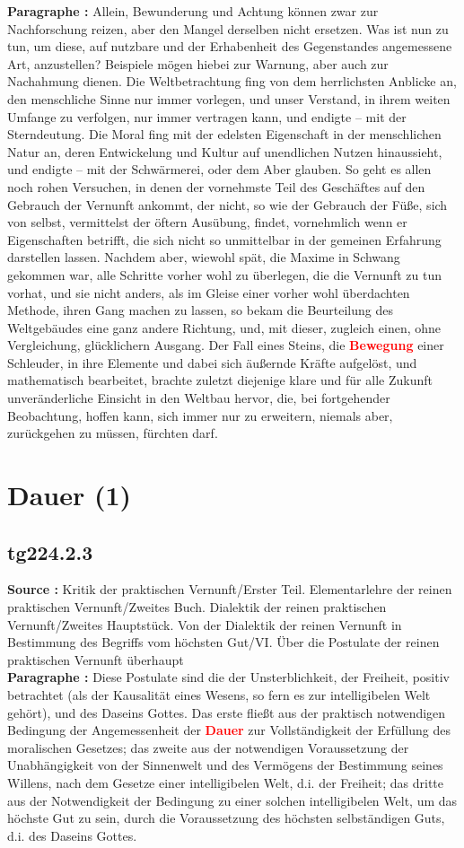 \documentclass[a4paper,12pt,twoside]{book}
\newcommand{\match}[1]{\textcolor{red}{\textbf{#1}}}
\newcommand{\unnumberedsection}[1]{
	\section*{#1}
	\addcontentsline{toc}{section}{#1}
	\markright{#1}
}
\begin{document}
	\textbf{Paragraphe : }Allein, Bewunderung und Achtung können zwar zur Nachforschung reizen, aber den Mangel derselben nicht ersetzen.  Was ist nun zu tun, um diese, auf nutzbare und der Erhabenheit des Gegenstandes angemessene Art, anzustellen? Beispiele mögen hiebei zur Warnung, aber auch zur Nachahmung dienen. Die Weltbetrachtung fing von dem herrlichsten Anblicke an, den menschliche Sinne nur immer vorlegen, und unser Verstand, in ihrem weiten Umfange zu verfolgen, nur immer vertragen kann, und endigte – mit der Sterndeutung. Die Moral fing mit der edelsten Eigenschaft in der menschlichen Natur an, deren Entwickelung und Kultur auf unendlichen Nutzen hinaussieht, und endigte – mit der Schwärmerei, oder dem Aber glauben. So geht es allen noch rohen Versuchen, in denen der vornehmste Teil des Geschäftes auf den Gebrauch der Vernunft ankommt, der nicht, so wie der Gebrauch der Füße, sich von selbst, vermittelst der öftern Ausübung, findet, vornehmlich wenn er Eigenschaften betrifft, die sich nicht so unmittelbar in der gemeinen Erfahrung darstellen lassen. Nachdem aber, wiewohl spät, die Maxime in Schwang gekommen war, alle Schritte vorher wohl zu überlegen, die die Vernunft zu tun vorhat, und sie nicht anders, als im Gleise einer vorher wohl überdachten Methode, ihren Gang machen zu lassen, so bekam die Beurteilung des Weltgebäudes eine ganz andere Richtung, und, mit dieser, zugleich einen, ohne Vergleichung, glücklichern Ausgang. Der Fall eines Steins, die \match{Bewegung} einer Schleuder, in ihre Elemente und dabei sich äußernde Kräfte aufgelöst, und mathematisch bearbeitet, brachte zuletzt diejenige klare und für alle Zukunft unveränderliche Einsicht in den Weltbau hervor, die, bei fortgehender Beobachtung, hoffen kann, sich immer nur zu erweitern, niemals aber, zurückgehen zu müssen, fürchten darf. 
	
	\unnumberedsection{Dauer (1)} 
	\subsection*{tg224.2.3} 
	\textbf{Source : }Kritik der praktischen Vernunft/Erster Teil. Elementarlehre der reinen praktischen Vernunft/Zweites Buch. Dialektik der reinen praktischen Vernunft/Zweites Hauptstück. Von der Dialektik der reinen Vernunft in Bestimmung des Begriffs vom höchsten Gut/VI. Über die Postulate der reinen praktischen Vernunft überhaupt\\  
	
	\textbf{Paragraphe : }Diese Postulate sind die der Unsterblichkeit, der Freiheit, positiv betrachtet (als der Kausalität eines Wesens, so fern es zur intelligibelen Welt gehört), und des Daseins Gottes. Das erste fließt aus der praktisch notwendigen Bedingung der Angemessenheit der \match{Dauer} zur Vollständigkeit der Erfüllung des moralischen Gesetzes; das zweite aus der notwendigen Voraussetzung der Unabhängigkeit von der Sinnenwelt und des Vermögens der Bestimmung seines Willens, nach dem Gesetze einer intelligibelen Welt, d.i. der Freiheit; das dritte aus der Notwendigkeit der Bedingung zu einer solchen intelligibelen Welt, um das höchste Gut zu sein, durch die Voraussetzung des höchsten selbständigen Guts, d.i. des Daseins Gottes. 
	
\end{document}
